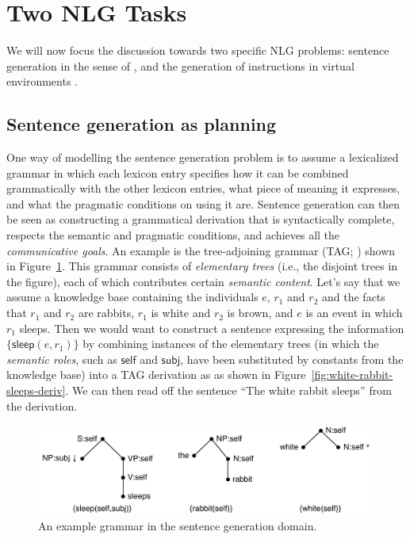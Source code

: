 \section{Two NLG Tasks}
\label{sec:domains}

We will now focus the discussion towards two specific NLG problems:
sentence generation in the sense of \cite{KolSto07}, and the
generation of instructions in virtual environments
\cite{ByrKolStrCasDalMooObe09}. 


\subsection{Sentence generation as planning}

One way of modelling the sentence generation problem is to assume a
lexicalized grammar in which each lexicon entry specifies how it can
be combined grammatically with the other lexicon entries, what piece
of meaning it expresses, and what the pragmatic conditions on using it
are. Sentence generation can then be seen as constructing a
grammatical derivation that is syntactically complete, respects the
semantic and pragmatic conditions, and achieves all the
\emph{communicative goals}. An example is the tree-adjoining grammar
(TAG; \citep{joshi;etal1997}) shown in
Figure~\ref{fig:white-rabbit-sleeps-grammar}. This grammar consists of
\emph{elementary trees} (i.e., the disjoint trees in the figure), each
of which contributes certain \emph{semantic content}. Let's say that
we assume a knowledge base containing the individuals $e$, $r_1$ and
$r_2$ and the facts that $r_1$ and $r_2$ are rabbits, $r_1$ is white
and $r_2$ is brown, and $e$ is an event in which $r_1$ sleeps. Then we
would want to construct a sentence expressing the information
$\{\mathsf{sleep}(e,r_1)\}$ by combining instances of the elementary
trees (in which the \emph{semantic roles}, such as $\mathsf{self}$ and
$\mathsf{subj}$, have been substituted by constants from the knowledge
base) into a TAG derivation as as shown in
Figure~\ref{fig:white-rabbit-sleeps-deriv}. We can then read off the
sentence ``The white rabbit sleeps'' from the derivation. 

\begin{figure}[t]
  \centering
  \includegraphics[width=0.75\columnwidth]{pic-grammar}
  \caption{An example grammar in the sentence generation domain.}
  \label{fig:white-rabbit-sleeps-grammar}
\end{figure}

